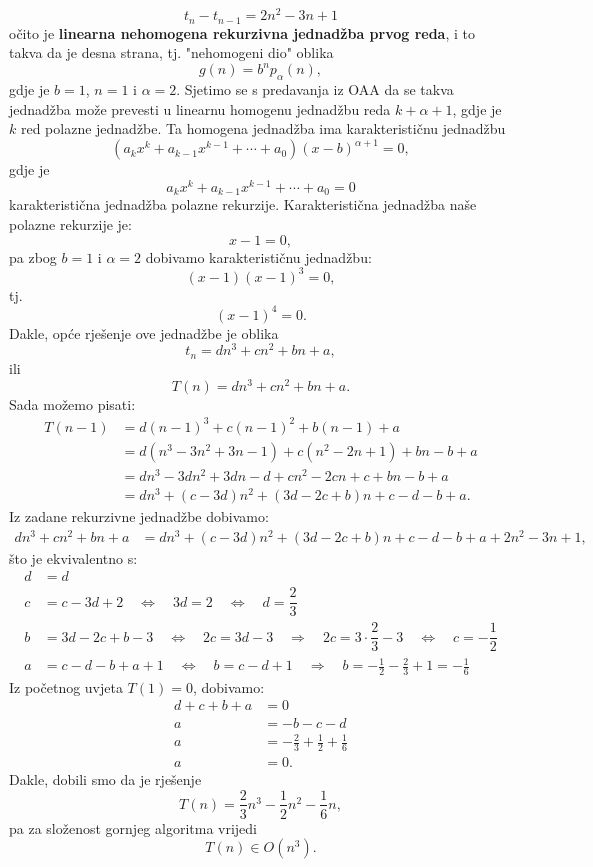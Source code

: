 \documentclass[a4paper,12pt,oneside]{article}
\begin{document}
$$t_n - t_{n-1} = 2n^2 -3n +1$$
očito je \textbf{linearna nehomogena rekurzivna jednadžba prvog reda}, i to takva da je desna strana, tj. "nehomogeni dio" oblika
$$g(n)=b^np_{\alpha}(n),$$
gdje je $b=1$, $n=1$ i $\alpha =2$. \newline\newline
\noindent Sjetimo se s predavanja iz OAA da se takva jednadžba može prevesti u linearnu homogenu jednadžbu reda $k+\alpha+1$, gdje je $k$ red polazne jednadžbe. \newline\newline
\noindent Ta homogena jednadžba ima karakterističnu jednadžbu
$$(a_kx^k+a_{k-1}x^{k-1}+\cdots+a_0)(x-b)^{\alpha+1}=0,$$
gdje je
$$a_kx^k+a_{k-1}x^{k-1}+\cdots+a_0=0$$
karakteristična jednadžba polazne rekurzije.\newline\newline
\noindent Karakteristična jednadžba naše polazne rekurzije je:
$$x-1 =0,$$
pa zbog $b=1$ i $\alpha =2$ dobivamo karakterističnu jednadžbu:
$$(x-1)(x-1)^3=0,$$
tj.
$$(x-1)^4=0.$$
Dakle, opće rješenje ove jednadžbe je oblika
$$t_n = dn^3+cn^2+bn + a,$$
ili
$$T(n)= dn^3+cn^2+bn + a.$$
Sada možemo pisati:
\begin{align*}
T(n-1) &= d(n-1)^3+c(n-1)^2+b(n-1) + a \\
&=d(n^3-3n^2+3n-1)+c(n^2-2n+1)+bn-b+a \\
&=dn^3-3dn^2+3dn-d+cn^2-2cn+c+bn-b+a \\
&=dn^3+(c-3d)n^2+(3d-2c+b)n+c-d-b+a.
\end{align*}
Iz zadane rekurzivne jednadžbe dobivamo:
\begin{align*}
	dn^3+cn^2+bn+a&=dn^3+(c-3d)n^2+(3d-2c+b)n+c-d-b+a + 2n^2-3n+1,
\end{align*}
što je ekvivalentno s:
 \begin{align*}
 	d &= d \\
 	c&=c-3d+2 \quad \Leftrightarrow \quad 3d=2 \quad \Leftrightarrow \quad d=\dfrac{2}{3} \\
 	b&=3d-2c+b-3 \quad \Leftrightarrow \quad 2c=3d-3 \quad \Rightarrow \quad 2c=3\cdot\dfrac{2}{3}-3\quad \Leftrightarrow \quad c=-\dfrac{1}{2} \\
 	a&=c-d-b+a +1\quad \Leftrightarrow \quad b=c-d+1 \quad \Rightarrow \quad b=-\frac12-\frac23+1=-\frac16
 \end{align*}
Iz početnog uvjeta $T(1)=0$, dobivamo:
 \begin{align*}
d+c+b+a&=0 \\
a&=-b-c-d \\
a&=-\frac23+\frac12+\frac16\\
a&=0.
\end{align*}
Dakle, dobili smo da je rješenje
$$\boxed{T(n)=\dfrac23n^3-\dfrac12n^2-\dfrac16 n},$$
pa za složenost gornjeg algoritma vrijedi
$$T(n)\in O(n^3).$$
\end{document}

